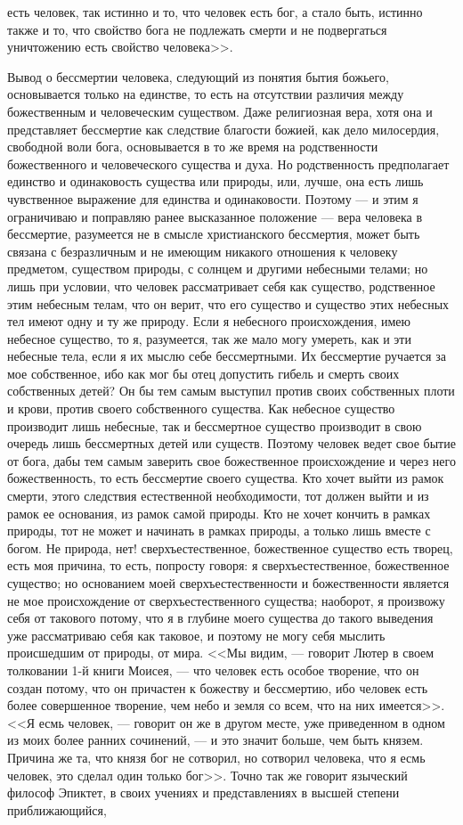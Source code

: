 \documentclass[12pt]{article}
\begin{document}
есть человек, так истинно и то, что человек есть бог, а стало быть, истинно также и то, что свойство бога не подлежать смерти и не подвергаться уничтожению есть свойство человека>>. 

Вывод о бессмертии человека, следующий из понятия бытия божьего, основывается только на единстве, то есть на отсутствии различия между божественным и человеческим существом. Даже религиозная вера, хотя она и представляет бессмертие как следствие благости божией, как дело милосердия, свободной воли бога, основывается в то же время на родственности божественного и человеческого существа и духа. Но родственность предполагает единство и одинаковость существа или природы, или, лучше, она есть лишь чувственное выражение для единства и одинаковости. Поэтому --- и этим я ограничиваю и поправляю ранее высказанное положение --- вера человека в бессмертие, разумеется не в смысле христианского бессмертия, может быть связана с безразличным и не имеющим никакого отношения к человеку предметом, существом природы, с солнцем и другими небесными телами; но лишь при условии, что человек рассматривает себя как существо, родственное этим небесным телам, что он верит, что его существо и существо этих небесных тел имеют одну и ту же природу. Если я небесного происхождения, имею небесное существо, то я, разумеется, так же мало могу умереть, как и эти небесные тела, если я их мыслю себе бессмертными. Их бессмертие ручается за мое собственное, ибо как мог бы отец допустить гибель и смерть своих собственных детей? Он бы тем самым выступил против своих собственных плоти и крови, против своего собственного существа. Как небесное существо производит лишь небесные, так и бессмертное существо производит в свою очередь лишь бессмертных детей или существ. Поэтому человек ведет свое бытие от бога, дабы тем самым заверить свое божественное происхождение и через него божественность, то есть бессмертие своего существа. Кто хочет выйти из рамок смерти, этого следствия естественной необходимости, тот должен выйти и из рамок ее основания, из рамок самой природы. Кто не хочет кончить в рамках природы, тот не может и начинать в рамках природы, а только лишь вместе с богом. Не природа, нет! сверхъестественное, божественное существо есть творец, есть моя причина, то есть, попросту говоря: я сверхъестественное, божественное существо; но основанием моей сверхъестественности и божественности является не мое происхождение от сверхъестественного существа; наоборот, я произвожу себя от такового потому, что я в глубине моего существа до такого выведения уже рассматриваю себя как таковое, и поэтому не могу себя мыслить происшедшим от природы, от мира. <<Мы видим, --- говорит Лютер в своем толковании 1-й книги Моисея, --- что человек есть особое творение, что он создан потому, что он причастен к божеству и бессмертию, ибо человек есть более совершенное творение, чем небо и земля со всем, что на них имеется>>. <<Я есмь человек, --- говорит он же в другом месте, уже приведенном в одном из моих более ранних сочинений, --- и это значит больше, чем быть князем. Причина же та, что князя бог не сотворил, но сотворил человека, что я есмь человек, это сделал один только бог>>. Точно так же говорит языческий философ Эпиктет, в своих учениях и представлениях в высшей степени приближающийся, 
\end{document}
